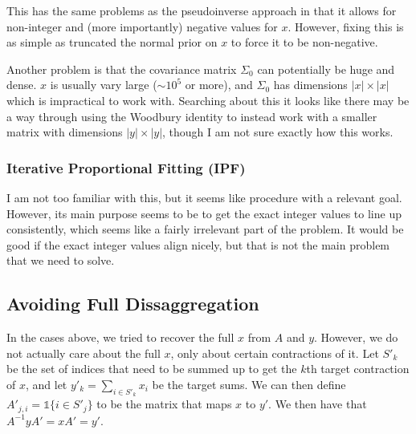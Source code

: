 \documentclass[12pt]{article}
\begin{document}
This has the same problems as the pseudoinverse approach in that it allows for non-integer and (more importantly) negative values for $x$. However, fixing this is as simple as truncated the normal prior on $x$ to force it to be non-negative.

Another problem is that the covariance matrix $\Sigma_0$ can potentially be huge and dense. $x$ is usually vary large ($\sim 10^5$ or more), and $\Sigma_0$ has dimensions $|x| \times |x|$ which is impractical to work with. Searching about this it looks like there may be a way through using the Woodbury identity to instead work with a smaller matrix with dimensions $|y| \times |y|$, though I am not sure exactly how this works.

\subsubsection{Iterative Proportional Fitting (IPF)}
I am not too familiar with this, but it seems like procedure with a relevant goal. However, its main purpose seems to be to get the exact integer values to line up consistently, which seems like a fairly irrelevant part of the problem. It would be good if the exact integer values align nicely, but that is not the main problem that we need to solve.


\subsection{Avoiding Full Dissaggregation}
In the cases above, we tried to recover the full $x$ from $A$ and $y$. However, we do not actually care about the full $x$, only about certain contractions of it. Let $S'_k$ be the set of indices that need to be summed up to get the $k$th target contraction of $x$, and let $y'_k = \sum_{i \in S'_k} x_i$ be the target sums. We can then define $A'_{j,i} = \mathbb{1}\{i \in S'_j\}$ to be the matrix that maps $x$ to $y'$. We then have that $A^{-1}yA' = xA' = y'$.




\end{document}
